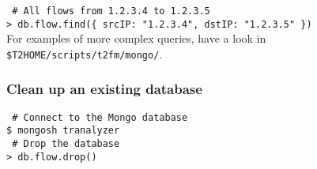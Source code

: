 \documentclass[documentation]{subfiles}
\begin{document}
\noindent
{\tt\color{blue} \# All flows from 1.2.3.4 to 1.2.3.5}\\
{\tt > db.flow.find(\{ srcIP: "1.2.3.4", dstIP: "1.2.3.5" \})}\\

\noindent
For examples of more complex queries, have a look in {\tt \$T2HOME/scripts/t2fm/mongo/}.

\subsubsection{Clean up an existing database}

{\tt\color{blue} \# Connect to the Mongo database}\\
{\tt \$ mongosh tranalyzer}\\

\noindent
{\tt\color{blue} \# Drop the database}\\
{\tt > db.flow.drop()}\\
\end{document}
